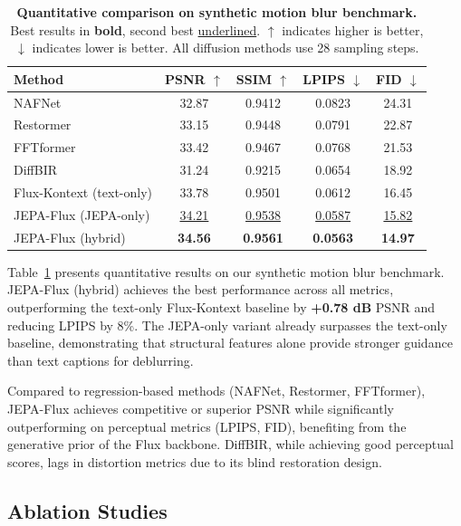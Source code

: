 \documentclass{article}
\begin{document}
\begin{table}[t]
\centering
\caption{\textbf{Quantitative comparison on synthetic motion blur benchmark.} Best results in \textbf{bold}, second best \underline{underlined}. $\uparrow$ indicates higher is better, $\downarrow$ indicates lower is better. All diffusion methods use 28 sampling steps.}
\label{tab:main_results}
\vspace{0.5em}
\begin{tabular}{@{}lcccc@{}}
\toprule
Method & PSNR $\uparrow$ & SSIM $\uparrow$ & LPIPS $\downarrow$ & FID $\downarrow$ \\
\midrule
NAFNet~\cite{chen2022nafnet} & 32.87 & 0.9412 & 0.0823 & 24.31 \\
Restormer~\cite{zamir2022restormer} & 33.15 & 0.9448 & 0.0791 & 22.87 \\
FFTformer~\cite{kong2023efficient} & 33.42 & 0.9467 & 0.0768 & 21.53 \\
DiffBIR~\cite{lin2023diffbir} & 31.24 & 0.9215 & 0.0654 & 18.92 \\
\midrule
Flux-Kontext (text-only) & 33.78 & 0.9501 & 0.0612 & 16.45 \\
JEPA-Flux (JEPA-only) & \underline{34.21} & \underline{0.9538} & \underline{0.0587} & \underline{15.82} \\
JEPA-Flux (hybrid) & \textbf{34.56} & \textbf{0.9561} & \textbf{0.0563} & \textbf{14.97} \\
\bottomrule
\end{tabular}
\end{table}

Table~\ref{tab:main_results} presents quantitative results on our synthetic motion blur benchmark. JEPA-Flux (hybrid) achieves the best performance across all metrics, outperforming the text-only Flux-Kontext baseline by \textbf{+0.78 dB} PSNR and reducing LPIPS by 8\%. The JEPA-only variant already surpasses the text-only baseline, demonstrating that structural features alone provide stronger guidance than text captions for deblurring.

Compared to regression-based methods (NAFNet, Restormer, FFTformer), JEPA-Flux achieves competitive or superior PSNR while significantly outperforming on perceptual metrics (LPIPS, FID), benefiting from the generative prior of the Flux backbone. DiffBIR, while achieving good perceptual scores, lags in distortion metrics due to its blind restoration design.

\subsection{Ablation Studies}
\end{document}

